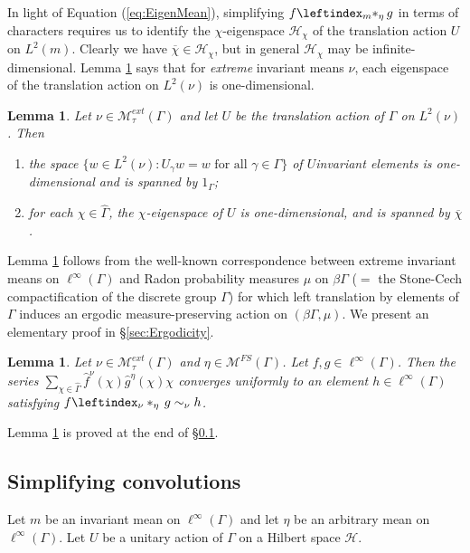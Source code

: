 \documentclass[12pt]{amsart} \usepackage{amsmath,centernot,amssymb,leftindex}
\newtheorem{lemma}[theorem]{Lemma}
\numberwithin{theorem}{section}
\numberwithin{equation}{section}
\theoremstyle{definition}
\begin{document}
In light of Equation (\ref{eq:EigenMean}), simplifying $f\leftindex_{m}{*}_\eta\, g$ in terms of characters requires us to identify the $\chi$-eigenspace $\mathcal H_{\chi}$ of the translation action $U$ on $L^{2}(m)$.  Clearly we have $\overline{\chi}\in \mathcal H_{\chi}$, but in general $\mathcal H_{\chi}$ may be infinite-dimensional.  Lemma \ref{lem:TranslationExtremeErgodic} says that for \emph{extreme} invariant means $\nu$, each eigenspace of the translation action on $L^{2}(\nu)$ is one-dimensional.
\begin{lemma}\label{lem:TranslationExtremeErgodic}
	Let $\nu\in \mathcal M_{\tau}^{ext}(\Gamma)$ and let $U$ be the translation action of $\Gamma$ on $L^{2}(\nu)$.  Then 
	
	\begin{enumerate} 
		\item\label{item:TranslationErgodicity} the space $\{w\in L^{2}(\nu): U_{\gamma} w = w \text{ for all } \gamma\in \Gamma \}$ of $U$\text{-}invariant elements is one-dimensional and is spanned by $1_{\Gamma}$;
		\item\label{item:TranslationEigenspace} for each $\chi\in \widehat{\Gamma}$, the $\chi$-eigenspace of $U$ is one-dimensional, and is spanned by $\overline{\chi}$.
	\end{enumerate}
\end{lemma}
Lemma \ref{lem:TranslationExtremeErgodic} follows from the well-known correspondence between extreme invariant means on $\ell^{\infty}(\Gamma)$ and Radon probability measures $\mu$ on $\beta\Gamma$ ($=$ the Stone-Cech compactification of the discrete group $\Gamma$)  for which left translation by elements of $\Gamma$ induces an ergodic measure-preserving action on $(\beta\Gamma,\mu)$.  We present an elementary proof in \S\ref{sec:Ergodicity}.


	\begin{lemma}\label{lem:FStarGExpansion}
	Let $\nu\in \mathcal M_{\tau}^{ext}(\Gamma)$ and $\eta\in \mathcal M^{FS}(\Gamma)$. Let $f, g\in \ell^{\infty}(\Gamma)$.  Then the series $\sum_{\chi\in\widehat{\Gamma}} \hat{f}^\nu(\chi)\hat{g}^\eta(\chi)\chi$ converges uniformly to an element $h\in \ell^{\infty}(\Gamma)$ satisfying $f\leftindex_\nu*_\eta\, g \sim_{\nu} h$.
\end{lemma}

Lemma \ref{lem:FStarGExpansion} is proved at the end of \S\ref{sec:SimplifyConvolution}. 





\subsection{Simplifying convolutions}\label{sec:SimplifyConvolution} Let $m$ be an invariant mean on $\ell^{\infty}(\Gamma)$ and let $\eta$ be an arbitrary mean on $\ell^{\infty}(\Gamma)$.  Let $U$ be a unitary action of $\Gamma$  on a Hilbert space $\mathcal H$.   
\end{document}
